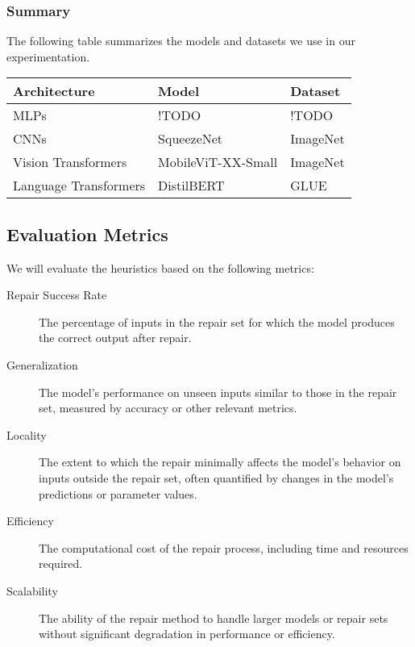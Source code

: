 \documentclass{article}
\begin{document}
\subsubsection{Summary}

The following table summarizes the models and datasets we use in our experimentation.

\begin{longtable}{p{} p{} p{}}
	\toprule
	\textbf{Architecture} & \textbf{Model}                      & \textbf{Dataset}         \\
	\midrule
	\endhead
	\bottomrule
	\endfoot
	\bottomrule
	\endlastfoot
	MLPs                  & !TODO                               & !TODO                    \\
	\midrule
	CNNs                  & SqueezeNet \cite{squeezenet}        & ImageNet \cite{imagenet} \\
	\midrule
	Vision Transformers   & MobileViT-XX-Small \cite{mobilevit} & ImageNet \cite{imagenet} \\
	\midrule
	Language Transformers & DistilBERT \cite{distilbert}        & GLUE \cite{GLUE}         \\
\end{longtable}

\subsection{Evaluation Metrics}
We will evaluate the heuristics based on the following metrics:
\begin{description}
	\item[Repair Success Rate] The percentage of inputs in the repair set for which the model produces the correct output after repair.
	\item[Generalization] The model's performance on unseen inputs similar to those in the repair set, measured by accuracy or other relevant metrics.
	\item[Locality] The extent to which the repair minimally affects the model's behavior on inputs outside the repair set, often quantified by changes in the model's predictions or parameter values.
	\item[Efficiency] The computational cost of the repair process, including time and resources required.
	\item[Scalability] The ability of the repair method to handle larger models or repair sets without significant degradation in performance or efficiency.
\end{description}



\end{document}
